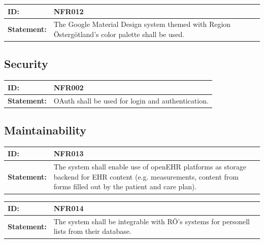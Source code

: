 \documentclass{scrreprt}
\begin{document}
\begin{center}
\begin{tabularx}{\linewidth}{| l | X |}
 \hline
 \textbf{ID:} & NFR012  \\ 
 \hline
 \textbf{Statement:} & The Google Material Design system themed with Region Östergötland’s color palette shall be used.
 \\ 
 \hline
\end{tabularx}
\end{center}

\subsection{Security}

\begin{center}
\begin{tabularx}{\linewidth}{| l | X |}
 \hline
 \textbf{ID:} & NFR002  \\ 
 \hline
 \textbf{Statement:} & OAuth shall be used for login and authentication.
 \\ 
 \hline
\end{tabularx}
\end{center}

\subsection{Maintainability}

\begin{center}
\begin{tabularx}{\linewidth}{| l | X |}
 \hline
 \textbf{ID:} & NFR013  \\ 
 \hline
 \textbf{Statement:} & The system shall enable use of openEHR platforms as storage backend for EHR content (e.g. measurements, content from forms filled out by the patient and care plan).
 \\ 
 \hline
\end{tabularx}
\end{center}

\begin{center}
\begin{tabularx}{\linewidth}{| l | X |}
 \hline
 \textbf{ID:} & NFR014  \\ 
 \hline
 \textbf{Statement:} & The system shall be integrable with RÖ’s systems for personell lists from their database.
 \\ 
 \hline
\end{tabularx}
\end{center}
\end{document}
